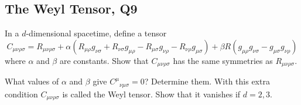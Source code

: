 \subsection{The Weyl Tensor, Q9}

In a $d$-dimensional spacetime, define a tensor
\begin{equation}
    C_{\mu\nu\rho\sigma} = R_{\mu\nu\rho\sigma} + \alpha(R_{\mu\rho}g_{\nu\sigma} + R_{\nu\sigma}g_{\mu\rho} - R_{\mu\sigma}g_{\nu\rho} - R_{\nu\rho}g_{\mu\sigma}) + \beta R(g_{\mu\rho}g_{\nu\sigma} - g_{\mu\sigma}g_{\nu\rho})
\end{equation}
where $\alpha$ and $\beta$ are constants. Show that $C_{\mu\nu\rho\sigma}$ has the same symmetries as $R_{\mu\nu\rho\sigma}$.

What values of $\alpha$ and $\beta$ give $C^\mu{}_{\nu\mu\sigma} = 0$? Determine them. With this extra condition $C_{\mu\nu\rho\sigma}$ is called the Weyl tensor. Show that it vanishes if $d=2,3$.

